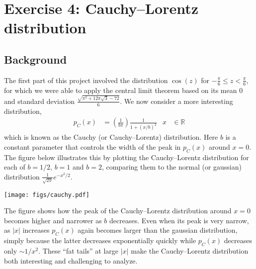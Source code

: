 \documentclass[12 pt]{article} %
\newcommand{\Rbb}{\ensuremath{\mathbb R} }
\begin{document}
\section*{Exercise 4: Cauchy--Lorentz distribution}
\subsection*{Background}
The first part of this project involved the distribution $\cos(z)$ for $-\frac{\pi}{6} \leq z < \frac{\pi}{6}$, for which we were able to apply the central limit theorem based on its mean $0$ and standard deviation $\frac{\sqrt{\pi^2 + 12\pi\sqrt{3} - 72}}{6}$.
We now consider a more interesting distribution,
\begin{align}
  \label{eq:cauchy}
  p_C(x) & = \left(\frac{1}{b \pi}\right) \frac{1}{1 + (x / b)^2} &
  x & \in \Rbb
\end{align}
which is known as the Cauchy (or Cauchy--Lorentz) distribution.
Here $b$ is a constant parameter that controls the width of the peak in $p_C(x)$ around $x = 0$.
The figure below illustrates this by plotting the Cauchy--Lorentz distribution for each of $b = 1 / 2$, $b = 1$ and $b = 2$, comparing them to the normal (or gaussian) distribution $\displaystyle \frac{1}{\sqrt{2\pi}} e^{-x^2 / 2}$.

\begin{center}\texttt{[image: figs/cauchy.pdf]}\end{center}

The figure shows how the peak of the Cauchy--Lorentz distribution around $x = 0$ becomes higher and narrower as $b$ decreases.
Even when its peak is very narrow, as $|x|$ increases $p_C(x)$ again becomes larger than the gaussian distribution, simply because the latter decreases exponentially quickly while $p_C(x)$ decreases only $\sim 1 / x^2$.
These ``fat tails'' at large $|x|$ make the Cauchy--Lorentz distribution both interesting and challenging to analyze.
\end{document}
